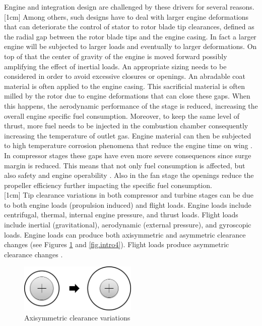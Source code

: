 Engine and integration design are challenged by these drivers for several reasons. [1cm] Among others, such designs have to deal with larger engine deformations that can deteriorate the control of stator to rotor blade  tip clearances, defined as the radial gap between the rotor blade tips and the engine casing. In fact a larger engine will be subjected to larger loads and eventually to larger deformations. On top of that the center of gravity of the engine is moved forward possibly amplifying the effect of inertial loads. An appropriate sizing needs to be considered in order to avoid excessive closures or openings.
An abradable coat material is often applied to the engine casing. 
 This sacrificial material is often milled by the rotor due to engine deformations that can close these gaps. When this happens, the aerodynamic performance of the stage is reduced, increasing the overall engine specific fuel consumption. Moreover, to keep the same level of thrust, more fuel needs to be injected in the combustion chamber consequently increasing the temperature of outlet gas. Engine material can then be subjected to high temperature corrosion phenomena that reduce the engine time on wing \cite{lattime2002turbine}. In compressor stages these gaps have even more severe consequences since surge margin is reduced. This means that not only fuel consumption is affected, but also safety and engine operability \cite{benito20083d}. Also in the fan stage the openings reduce the propeller efficiency further impacting the specific fuel consumption.\\
[1cm]  
Tip clearance variations in both compressor and turbine stages can be due to both  engine loads (propulsion induced) and flight loads. Engine loads include centrifugal, thermal,
internal engine pressure, and thrust loads. Flight loads
include inertial (gravitational), aerodynamic (external
pressure), and gyroscopic loads. Engine loads can
produce both axisymmetric and asymmetric clearance
changes (see Figures \ref{fig.intro3} and \ref{fig.intro4}). Flight loads produce
asymmetric clearance changes \cite{lattime2002turbine}. 
\begin{figure}[!ht]
\centering   
 \includegraphics[width=0.5\textwidth]{images/intro/axisym_tip}
     \caption{Axisymmetric clearance variations} 
     \label{fig.intro3}
\end{figure}
